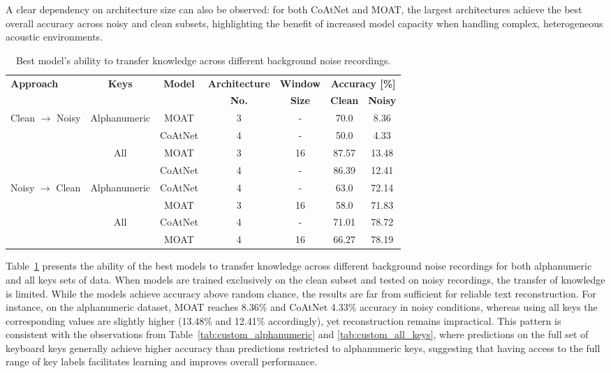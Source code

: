 \documentclass[a4paper,11pt,twoside]{report}
\theoremstyle{definition}
\begin{document}
A clear dependency on architecture size can also be observed: for both CoAtNet and MOAT, the largest architectures achieve the best overall accuracy across noisy and clean subsets, highlighting the benefit of increased model capacity when handling complex, heterogeneous acoustic environments.

\begin{table}[h!]
\centering
\caption{Best model's ability to transfer knowledge across different background noise recordings.}
\begin{adjustbox}{max width=\textwidth}
\begin{tabular}{l|c|c|c|c|cc}
\hline
\textbf{Approach} & \textbf{Keys} & \textbf{Model} & \textbf{Architecture} & \textbf{Window} &  \multicolumn{2}{c}{\textbf{Accuracy [\%]}} \\
\cline{6-7}
       & & & \textbf{No.}  &   \textbf{Size}   &  \textbf{Clean} & \textbf{Noisy}  \\
\hline
\multirow{4}{*}{Clean $\rightarrow$ Noisy}
& \multirow{2}{*}{Alphanumeric} & MOAT    & 3 & -  & 70.0  & 8.36  \\
&                               & CoAtNet & 4 & -  & 50.0  & 4.33  \\
\cline{2-7}
& \multirow{2}{*}{All}          & MOAT    & 3 & 16 & 87.57 & 13.48 \\
&                               & CoAtNet & 4 & -  & 86.39 & 12.41 \\
\hline
\multirow{4}{*}{Noisy $\rightarrow$ Clean}
& \multirow{2}{*}{Alphanumeric} & CoAtNet & 4 & -  & 63.0  & 72.14 \\
&                               & MOAT    & 3 & 16 & 58.0  & 71.83 \\
\cline{2-7}
& \multirow{2}{*}{All}          & CoAtNet & 4 & -  & 71.01 & 78.72 \\
&                               & MOAT    & 4 & 16 & 66.27 & 78.19 \\
\hline
\end{tabular}
\end{adjustbox}
\label{tab:transfer_accuracy}
\end{table}

Table~\ref{tab:transfer_accuracy} presents the ability of the best models to transfer knowledge across different background noise recordings for both alphanumeric and all keys sets of data. When models are trained exclusively on the clean subset and tested on noisy recordings, the transfer of knowledge is limited. While the models achieve accuracy above random chance, the results are far from sufficient for reliable text reconstruction. For instance, on the alphanumeric dataset, MOAT reaches 8.36\% and CoAtNet 4.33\% accuracy in noisy conditions, whereas using all keys the corresponding values are slightly higher (13.48\% and 12.41\% accordingly), yet reconstruction remains impractical. This pattern is consistent with the observations from Table~\ref{tab:custom_alphanumeric} and \ref{tab:custom_all_keys}, where predictions on the full set of keyboard keys generally achieve higher accuracy than predictions restricted to alphanumeric keys, suggesting that having access to the full range of key labels facilitates learning and improves overall performance.
\end{document}
